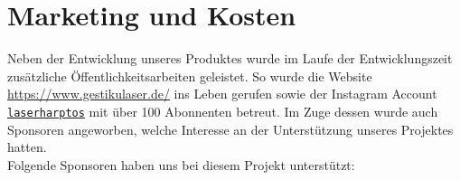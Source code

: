 \chapter{Marketing und Kosten}
\label{ch:Kosten}

Neben der Entwicklung unseres Produktes wurde im Laufe der Entwicklungszeit zusätzliche Öffentlichkeitsarbeiten geleistet. So wurde die Website \url{https://www.gestikulaser.de/} ins Leben gerufen sowie der Instagram Account \href{https://www.instagram.com/laserharptos/}{\texttt{laserharptos}} mit über 100 Abonnenten betreut. 
Im Zuge dessen wurde auch Sponsoren angeworben, welche Interesse an der Unterstützung unseres Projektes hatten. \\

Folgende Sponsoren haben uns bei diesem Projekt unterstützt: \\

